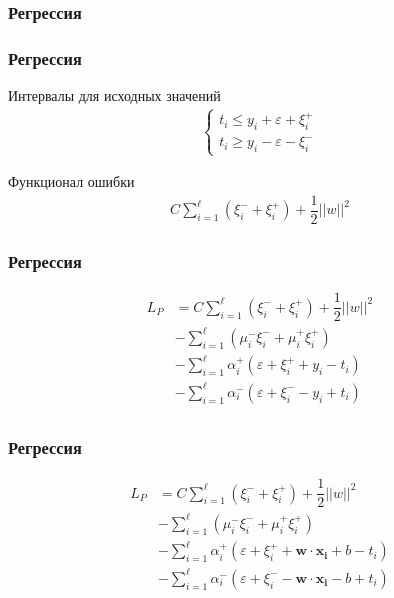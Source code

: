 \documentclass[14pt]{beamer}
\begin{document}
\begin{frame}
\frametitle{Регрессия}
\end{frame}

\begin{frame}
\frametitle{Регрессия}
Интервалы для исходных значений
\begin{align*}
  \begin{cases}
    t_i \leqslant y_i + \varepsilon + \xi^+_i\\
    t_i \geqslant y_i - \varepsilon - \xi^-_i
  \end{cases}
\end{align*}

Функционал ошибки
\begin{align*}
  C\sum\limits_{i = 1}^{\ell}(\xi_i^- + \xi_i^+) + \dfrac{1}{2}||w||^2
\end{align*}
\end{frame}

\begin{frame}
\frametitle{Регрессия}
\begin{align*}
  L_P &= C\sum\limits_{i = 1}^{\ell}(\xi_i^- + \xi_i^+) + \dfrac{1}{2}||w||^2 \\
  &- \sum\limits_{i = 1}^{\ell}(\mu_i^-\xi_i^- + \mu_i^+\xi_i^+)\\
  &- \sum\limits_{i = 1}^{\ell}\alpha_i^+(\varepsilon + \xi_i^+ + y_i - t_i)\\
  &- \sum\limits_{i = 1}^{\ell}\alpha_i^-(\varepsilon + \xi_i^- - y_i + t_i)\\
\end{align*}
\end{frame}

\begin{frame}
\frametitle{Регрессия}
\begin{align*}
  L_P &= C\sum\limits_{i = 1}^{\ell}(\xi_i^- + \xi_i^+) + \dfrac{1}{2}||w||^2 \\
  &- \sum\limits_{i = 1}^{\ell}(\mu_i^-\xi_i^- + \mu_i^+\xi_i^+)\\
  &- \sum\limits_{i = 1}^{\ell}\alpha_i^+(\varepsilon + \xi_i^+ + \mathbf{w}\cdot\mathbf{x_i} + b - t_i)\\
  &- \sum\limits_{i = 1}^{\ell}\alpha_i^-(\varepsilon + \xi_i^- - \mathbf{w}\cdot\mathbf{x_i} - b + t_i)\\
\end{align*}
\end{frame}
\end{document}
